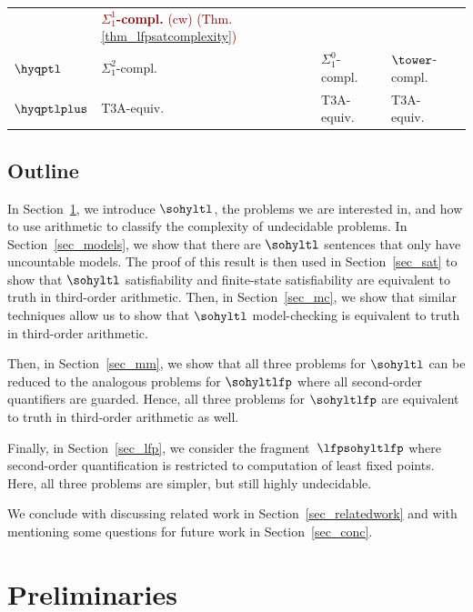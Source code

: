 \begin{table}[h]
\begin{tabular}{llll}
                        & \textcolor{Maroon}{\textbf{\boldmath$\Sigma_1^1$-compl.} (cw) (Thm.\ref{thm_lfpsatcomplexity})} &&\\
        \rowcolor{lightgray!40}$\hyqptl$ &  $\Sigma^2_1$-compl.~\cite{regaud2024complexityhyperqptl} & $\Sigma_1^0$-compl.~\cite{Rabe16diss} & $\tower$-compl.~\cite{Rabe16diss}\\
        $\hyqptlplus$ & T3A-equiv.~\cite{regaud2024complexityhyperqptl} &  T3A-equiv.~\cite{regaud2024complexityhyperqptl} &  T3A-equiv.~\cite{regaud2024complexityhyperqptl}\\
    \end{tabular}
    \label{table_results}
\end{table}


\subsection{Outline}
In Section~\ref{sec:prels}, we introduce $\sohyltl$, the problems we are interested in, and how to use arithmetic to classify the complexity of undecidable problems.
In Section~\ref{sec_models}, we show that there are $\sohyltl$ sentences that only have uncountable models.
The proof of this result is then used in Section~\ref{sec_sat} to show that $\sohyltl$ satisfiability and finite-state satisfiability are equivalent to truth in third-order arithmetic. 
Then, in Section~\ref{sec_mc}, we show that similar techniques allow us to show that $\sohyltl$ model-checking is equivalent to truth in third-order arithmetic.

Then, in Section~\ref{sec_mm}, we show that all three problems for $\sohyltl$ can be reduced to the analogous problems for $\sohyltlfp$ where all second-order quantifiers are guarded. Hence, all three problems for $\sohyltlfp$ are equivalent to truth in third-order arithmetic as well.

Finally, in Section~\ref{sec_lfp}, we consider the fragment~$\lfpsohyltlfp$ where second-order quantification is restricted to computation of least fixed points. Here, all three problems are simpler, but still highly undecidable.

We conclude with discussing related work in Section~\ref{sec_relatedwork} and with mentioning some questions for future work in Section~\ref{sec_conc}.

\section{Preliminaries}
\label{sec:prels}


